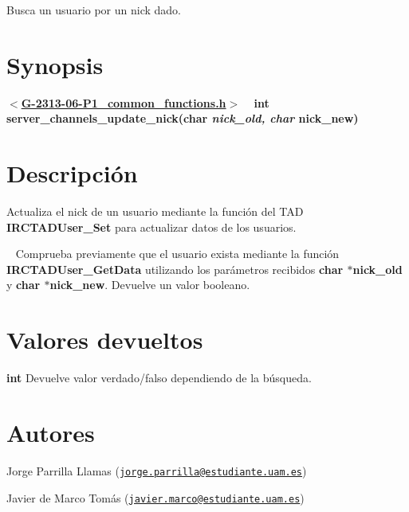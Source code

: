Busca un usuario por un nick dado.\hypertarget{server_channels_update_nick_synopsis_server_channels_update_nick}{}\section{Synopsis}\label{server_channels_update_nick_synopsis_server_channels_update_nick}
{ {\bfseries $<$\hyperlink{G-2313-06-P1__common__functions_8h_source}{G-\/2313-\/06-\/\+P1\+\_\+common\+\_\+functions.\+h}$>$} ~\newline
 {\bfseries int server\+\_\+channels\+\_\+update\+\_\+nick(char {\itshape nick\+\_\+old, char} nick\+\_\+new)} } \hypertarget{server_channels_update_nick_descripcion_server_channels_update_nick}{}\section{Descripción}\label{server_channels_update_nick_descripcion_server_channels_update_nick}
Actualiza el nick de un usuario mediante la función del T\+A\+D {\bfseries I\+R\+C\+T\+A\+D\+User\+\_\+\+Set} para actualizar datos de los usuarios. 

~\newline
Comprueba previamente que el usuario exista mediante la función {\bfseries I\+R\+C\+T\+A\+D\+User\+\_\+\+Get\+Data} utilizando los parámetros recibidos {\bfseries char $\ast$nick\+\_\+old} y {\bfseries char $\ast$nick\+\_\+new}. Devuelve un valor booleano.\hypertarget{server_channels_update_nick_return_server_channels_update_nick}{}\section{Valores devueltos}\label{server_channels_update_nick_return_server_channels_update_nick}

\begin{DoxyItemize}
\item {\bfseries int} Devuelve valor verdado/falso dependiendo de la búsqueda. 
\end{DoxyItemize}\hypertarget{server_channels_update_nick_authors_server_channels_update_nick}{}\section{Autores}\label{server_channels_update_nick_authors_server_channels_update_nick}

\begin{DoxyItemize}
\item Jorge Parrilla Llamas (\href{mailto:jorge.parrilla@estudiante.uam.es}{\tt jorge.\+parrilla@estudiante.\+uam.\+es}) 
\item Javier de Marco Tomás (\href{mailto:javier.marco@estudiante.uam.es}{\tt javier.\+marco@estudiante.\+uam.\+es}) 
\end{DoxyItemize}